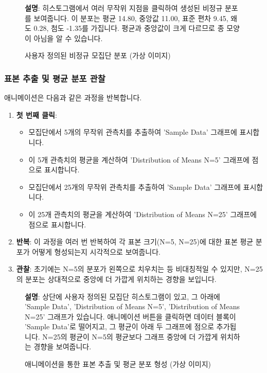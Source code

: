 \documentclass[11pt,a4paper]{book}
\theoremstyle{definition}
\begin{document}
\begin{figure}[h!]
    \centering
    \caption{사용자 정의된 비정규 모집단 분포 (가상 이미지)}
    \label{fig:custom_pop}
    \textbf{설명}: 히스토그램에서 여러 무작위 지점을 클릭하여 생성된 비정규 분포를 보여줍니다. 이 분포는 평균 14.80, 중앙값 11.00, 표준 편차 9.45, 왜도 0.28, 첨도 -1.35를 가집니다. 평균과 중앙값이 크게 다르므로 종 모양이 아님을 알 수 있습니다.
\end{figure}

\subsubsection*{표본 추출 및 평균 분포 관찰}

애니메이션은 다음과 같은 과정을 반복합니다.
\begin{enumerate}
    \item \textbf{첫 번째 클릭}:
    \begin{itemize}
        \item 모집단에서 5개의 무작위 관측치를 추출하여 'Sample Data' 그래프에 표시합니다.
        \item 이 5개 관측치의 평균을 계산하여 'Distribution of Means N=5' 그래프에 점으로 표시합니다.
        \item 모집단에서 25개의 무작위 관측치를 추출하여 'Sample Data' 그래프에 표시합니다.
        \item 이 25개 관측치의 평균을 계산하여 'Distribution of Means N=25' 그래프에 점으로 표시합니다.
    \end{itemize}
    \item \textbf{반복}: 이 과정을 여러 번 반복하여 각 표본 크기(N=5, N=25)에 대한 표본 평균 분포가 어떻게 형성되는지 시각적으로 보여줍니다.
    \item \textbf{관찰}: 초기에는 N=5의 분포가 왼쪽으로 치우치는 등 비대칭적일 수 있지만, N=25의 분포는 상대적으로 중앙에 더 가깝게 위치하는 경향을 보입니다.
\end{enumerate}

\begin{figure}[h!]
    \centering
    \caption{애니메이션을 통한 표본 추출 및 평균 분포 형성 (가상 이미지)}
    \label{fig:animation_step}
    \textbf{설명}: 상단에 사용자 정의된 모집단 히스토그램이 있고, 그 아래에 'Sample Data', 'Distribution of Means N=5', 'Distribution of Means N=25' 그래프가 있습니다. 애니메이션 버튼을 클릭하면 데이터 블록이 'Sample Data'로 떨어지고, 그 평균이 아래 두 그래프에 점으로 추가됩니다. N=25의 평균이 N=5의 평균보다 그래프 중앙에 더 가깝게 위치하는 경향을 보여줍니다.
\end{figure}
\end{document}
